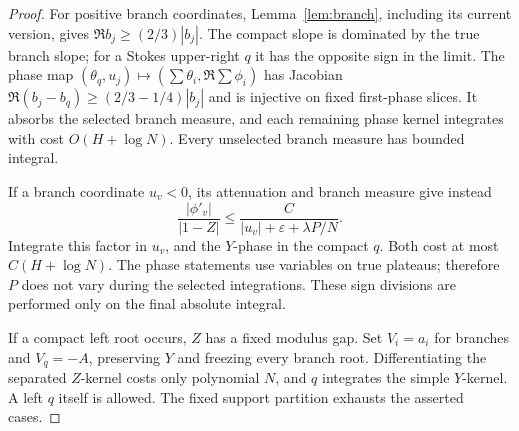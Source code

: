 \documentclass[11pt]{article}
\numberwithin{equation}{section}
\theoremstyle{definition}
\newcommand{\eps}{\varepsilon}
\begin{document}
\begin{proof}
For positive branch coordinates, Lemma~\ref{lem:branch}, including
its current version, gives \(\Re b_j\ge(2/3)|b_j|\).
The compact slope is dominated by the true branch slope; for a
Stokes upper-right \(q\) it has the opposite sign in the limit.
The phase map
\((\theta_q,u_j)\mapsto(\sum\theta_i,\Re\sum\phi_i)\)
has Jacobian \(\Re(b_j-b_q)\ge(2/3-1/4)|b_j|\)
and is injective on fixed first-phase slices.
It absorbs the selected branch measure, and each remaining phase
kernel integrates with cost \(O(H+\log N)\).
Every unselected branch measure has bounded integral.

If a branch coordinate \(u_v<0\), its attenuation and branch measure
give instead
\[
 \frac{|\phi'_v|}{|1-Z|}
 \le\frac C{|u_v|+\eps+\lambda P/N}.
\]
Integrate this factor in \(u_v\), and the \(Y\)-phase in the compact
\(q\). Both cost at most \(C(H+\log N)\).
The phase statements use variables on true plateaus; therefore \(P\)
does not vary during the selected integrations.
These sign divisions are performed only on the final absolute integral.

If a compact left root occurs, \(Z\) has a fixed modulus gap.
Set \(V_i=a_i\) for branches and \(V_q=-A\), preserving \(Y\)
and freezing every branch root. Differentiating the separated
\(Z\)-kernel costs only polynomial \(N\), and \(q\) integrates
the simple \(Y\)-kernel. A left \(q\) itself is allowed.
The fixed support partition exhausts the asserted cases.
\end{proof}
\end{document}
